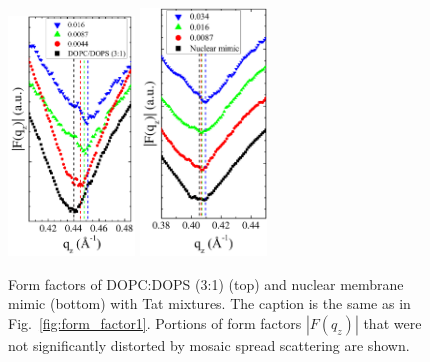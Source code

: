 \begin{figure}[htbp]
  \centering
  \includegraphics[width=0.3\textwidth]{figures/Tat/NFIT_results/DOPCDOPS3to1_form_factors}
  \qquad  
  \includegraphics[width=0.3\textwidth]{figures/Tat/NFIT_results/nuclear_form_factors}
  \caption{Form factors of DOPC:DOPS (3:1) (top) and nuclear membrane mimic 
  (bottom) with Tat mixtures.
  The caption is the same as in Fig.~\ref{fig:form_factor1}.
  Portions of form factors $|F(q_z)|$ that were not significantly distorted 
  by mosaic spread scattering are shown.}
  \label{fig:form_factor4}
\end{figure}



\newpage
